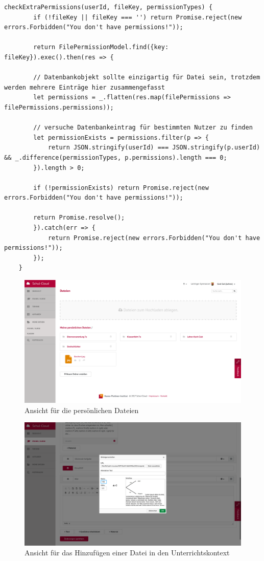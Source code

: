 \begin{lstlisting}[caption=checkExtraPermissions() Funktion des filePermissionHelper, label=code:fphextra]
	checkExtraPermissions(userId, fileKey, permissionTypes) {
		if (!fileKey || fileKey === '') return Promise.reject(new errors.Forbidden("You don't have permissions!"));
	
		return FilePermissionModel.find({key: fileKey}).exec().then(res => {
		
		// Datenbankobjekt sollte einzigartig für Datei sein, trotzdem werden mehrere Einträge hier zusammengefasst
		let permissions = _.flatten(res.map(filePermissions => filePermissions.permissions));
	
		// versuche Datenbankeintrag für bestimmten Nutzer zu finden
		let permissionExists = permissions.filter(p => {
			return JSON.stringify(userId) === JSON.stringify(p.userId) && _.difference(permissionTypes, p.permissions).length === 0;
		}).length > 0;
	
		if (!permissionExists) return Promise.reject(new errors.Forbidden("You don't have permissions!"));
	
		return Promise.resolve();
		}).catch(err => {
			return Promise.reject(new errors.Forbidden("You don't have permissions!"));
		});
	}
\end{lstlisting}

\begin{figure}[H]
	\centering
	\includegraphics[width=1\linewidth]{images/screenMeineDateien}
	\caption{Ansicht für die persönlichen Dateien}
	\label{fig:screenMeineDateien}
\end{figure}

\begin{figure}[H]
	\centering
	\includegraphics[width=1\linewidth]{images/screenCkEditor}
	\caption{Ansicht für das Hinzufügen einer Datei in den Unterrichtskontext}
	\label{fig:screenCkEditor}
\end{figure}
\clearpage